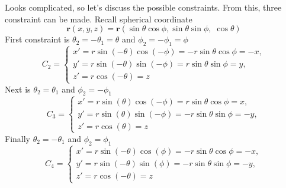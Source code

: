 \documentclass[../../../main.tex]{subfiles}
\begin{document}
Looks complicated, so let's discuss the possible constraints.
From this, three constraint can be made.
Recall spherical coordinate
\begin{equation*}
  \mathbf r(x,y,z)
  =
  \mathbf r(\sin\theta\cos\phi,
  \sin\theta\sin\phi,\;
  \cos\theta)
\end{equation*}
First constraint is $\theta_2=-\theta_1=\theta$ and $ \phi_2=-\phi_1=\phi$
\begin{equation*}
  C_2=\begin{cases}
    x'
    =r\sin(-\theta)\cos(-\phi)
    =-r\sin\theta\cos\phi=-x, \\
    y'
    =r\sin(-\theta)\sin(-\phi)
    =r\sin\theta\sin\phi=y,   \\
    z'
    =r\cos(-\theta)=z
  \end{cases}
\end{equation*}
Next is $\theta_2=\theta_1$ and $ \phi_2=-\phi_1$
\begin{equation*}
  C_3=\begin{cases}
    x'
    =r\sin(\theta)\cos(-\phi)
    =r\sin\theta\cos\phi=x,   \\
    y'
    =r\sin(\theta)\sin(-\phi)
    =-r\sin\theta\sin\phi=-y, \\
    z'
    =r\cos(\theta)=z
  \end{cases}
\end{equation*}
Finally $\theta_2=-\theta_1$ and $ \phi_2=\phi_1$
\begin{equation*}
  C_4=\begin{cases}
    x'
    =r\sin(-\theta)\cos(\phi)
    =-r\sin\theta\cos\phi=-x, \\
    y'
    =r\sin(-\theta)\sin(\phi)
    =-r\sin\theta\sin\phi=-y, \\
    z'
    =r\cos(-\theta)=z
  \end{cases}
\end{equation*}
\end{document}
